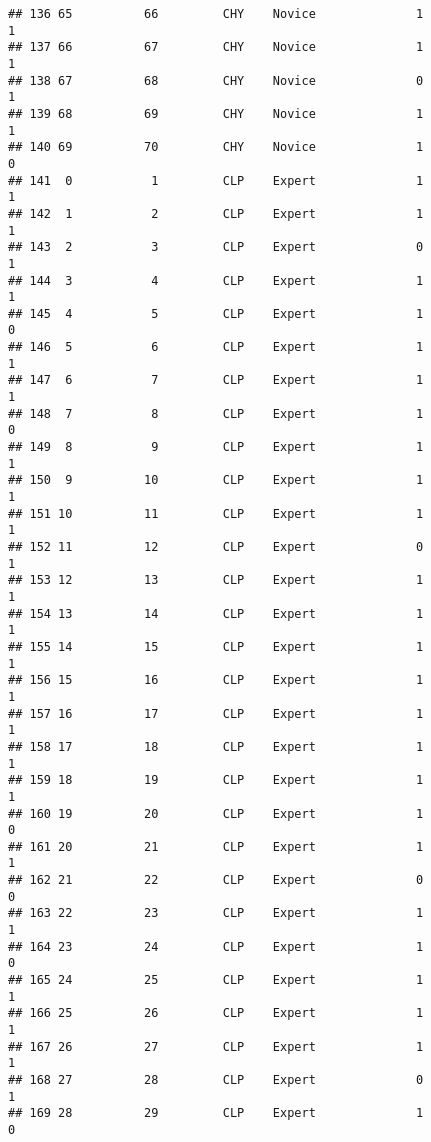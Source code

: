 \documentclass[
]{article}
\begin{document}
\begin{verbatim}
## 136 65          66         CHY    Novice              1                 1
## 137 66          67         CHY    Novice              1                 1
## 138 67          68         CHY    Novice              0                 1
## 139 68          69         CHY    Novice              1                 1
## 140 69          70         CHY    Novice              1                 0
## 141  0           1         CLP    Expert              1                 1
## 142  1           2         CLP    Expert              1                 1
## 143  2           3         CLP    Expert              0                 1
## 144  3           4         CLP    Expert              1                 1
## 145  4           5         CLP    Expert              1                 0
## 146  5           6         CLP    Expert              1                 1
## 147  6           7         CLP    Expert              1                 1
## 148  7           8         CLP    Expert              1                 0
## 149  8           9         CLP    Expert              1                 1
## 150  9          10         CLP    Expert              1                 1
## 151 10          11         CLP    Expert              1                 1
## 152 11          12         CLP    Expert              0                 1
## 153 12          13         CLP    Expert              1                 1
## 154 13          14         CLP    Expert              1                 1
## 155 14          15         CLP    Expert              1                 1
## 156 15          16         CLP    Expert              1                 1
## 157 16          17         CLP    Expert              1                 1
## 158 17          18         CLP    Expert              1                 1
## 159 18          19         CLP    Expert              1                 1
## 160 19          20         CLP    Expert              1                 0
## 161 20          21         CLP    Expert              1                 1
## 162 21          22         CLP    Expert              0                 0
## 163 22          23         CLP    Expert              1                 1
## 164 23          24         CLP    Expert              1                 0
## 165 24          25         CLP    Expert              1                 1
## 166 25          26         CLP    Expert              1                 1
## 167 26          27         CLP    Expert              1                 1
## 168 27          28         CLP    Expert              0                 1
## 169 28          29         CLP    Expert              1                 0

\end{verbatim}
\end{document}
